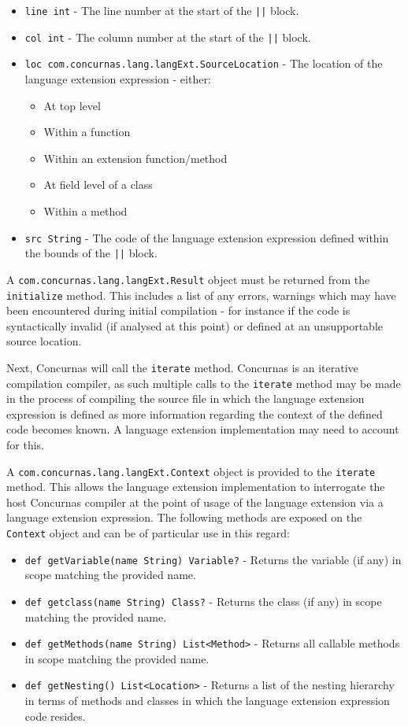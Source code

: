 \documentclass[conc-doc]{subfiles}
\begin{document}
\begin{itemize}
	\item \lstinline{line int} - The line number at the start of the \lstinline{||} block.
	\item \lstinline{col int} - The column number at the start of the \lstinline{||} block.
	\item \lstinline{loc com.concurnas.lang.langExt.SourceLocation} - The location of the language extension expression - either:
	\begin{itemize}
		\item At top level
		\item Within a function
		\item Within an extension function/method
		\item At field level of a class
		\item Within a method		 
	\end{itemize}	
	\item \lstinline{src String} - The code of the language extension expression defined within the bounds of the \lstinline{||} block.
\end{itemize}

A \lstinline{com.concurnas.lang.langExt.Result} object must be returned from the \lstinline{initialize} method. This includes a list of any errors, warnings which may have been encountered during initial compilation - for instance if the code is syntactically invalid (if analysed at this point) or defined at an unsupportable source location.

Next, Concurnas will call the \lstinline{iterate} method. Concurnas is an iterative compilation compiler, as such multiple calls to the \lstinline{iterate} method may be made in the process of compiling the source file in which the language extension expression is defined as more information regarding the context of the defined code becomes known. A language extension implementation may need to account for this.

A \lstinline{com.concurnas.lang.langExt.Context} object is provided to the \lstinline{iterate} method. This allows the language extension implementation to interrogate the host Concurnas compiler at the point of usage of the language extension via a language extension expression. The following methods are exposed on the \lstinline{Context} object and can be of particular use in this regard:

\begin{itemize}
	\item \lstinline{def getVariable(name String) Variable?} - Returns the variable (if any) in scope matching the provided name.
	\item \lstinline{def getclass(name String) Class?} - Returns the class (if any) in scope matching the provided name.
	\item \lstinline{def getMethods(name String) List<Method>} - Returns all callable methods in scope matching the provided name.
	\item \lstinline{def getNesting() List<Location>} - Returns a list of the nesting hierarchy in terms of methods and classes in which the language extension expression code resides.
\end{itemize}
\end{document}
